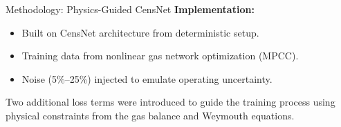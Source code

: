 \documentclass[hyperref={colorlinks,citecolor=blue,linkcolor=blue,urlcolor=blue}]{beamer}
\begin{document}
\begin{frame}{Methodology: Physics-Guided CensNet}
\justifying
\footnotesize
\textbf{Implementation:}
\begin{itemize}
    \item Built on CensNet architecture from deterministic setup.
    \item Training data from nonlinear gas network optimization (MPCC).
    \item Noise (5\%–25\%) injected to emulate operating uncertainty.
\end{itemize}
\vspace{0.5em}
\centering
    \resizebox{0.95\linewidth}{!}{}

\vspace{0.8em}
Two additional loss terms were introduced to guide the training process using physical constraints from the gas balance and Weymouth equations.
\end{frame}
\end{document}
